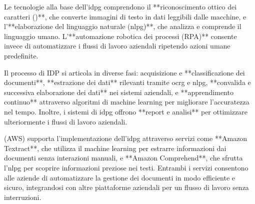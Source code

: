 Le tecnologie alla base dell'\gls{idpg} comprendono il **riconoscimento ottico dei caratteri ()**, che converte immagini di testo in dati leggibili dalle macchine, e l'**elaborazione del linguaggio naturale (\gls{nlpg})**, che analizza e comprende il linguaggio umano. L'**automazione robotica dei processi (RPA)** consente invece di automatizzare i flussi di lavoro aziendali ripetendo azioni umane predefinite.

Il processo di IDP si articola in diverse fasi: acquisizione e **classificazione dei documenti**, **estrazione dei dati** rilevanti tramite \gls{ocrg} e \gls{nlpg}, **convalida e successiva elaborazione dei dati** nei sistemi aziendali, e **apprendimento continuo** attraverso algoritmi di machine learning per migliorare l'accuratezza nel tempo. Inoltre, i sistemi di \gls{idpg} offrono **report e analisi** per ottimizzare ulteriormente i flussi di lavoro aziendali.

 (AWS) supporta l'implementazione dell'\gls{idpg} attraverso servizi come **Amazon Textract**, che utilizza il machine learning per estrarre informazioni dai documenti senza interazioni manuali, e **Amazon Comprehend**, che sfrutta l'\gls{nlpg} per scoprire informazioni preziose nei testi. Entrambi i servizi consentono alle aziende di automatizzare la gestione dei documenti in modo efficiente e sicuro, integrandosi con altre piattaforme aziendali per un flusso di lavoro senza interruzioni.


%
%
%
